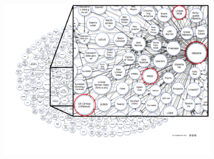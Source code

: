 \documentclass{beamer}
\begin{document}
\begin{frame}
  \begin{figure}
  \includegraphics[width=1\linewidth]{./Figures/lod-zoomed2}
  \end{figure}
\end{frame}
\end{document}
